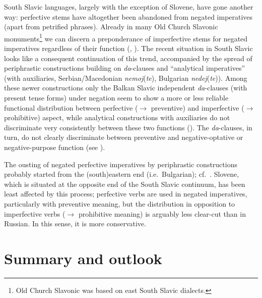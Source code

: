 \documentclass[output=paper,colorlinks,citecolor=brown]{langscibook}
\begin{document}
South Slavic languages, largely with the exception of Slovene, have gone another way: perfective stems have altogether been abandoned from negated imperatives (apart from petrified phrases). Already in many Old Church Slavonic monuments\footnote{Old Church Slavonic was based on east South Slavic dialects.} we can discern a preponderance of imperfective stems for negated imperatives regardless of their function (\citealt[71]{Kurzova-Ribarova1972}, \citealt[70--73]{Večerka1996}). The recent situation in South Slavic looks like a consequent continuation of this trend, accompanied by the spread of periphrastic constructions building on \textit{da}-clauses and ``analytical imperatives'' (with auxiliaries, Serbian/Macedonian \textit{nemoj}(\textit{te}), Bulgarian \textit{nedej}(\textit{te})). Among these newer constructions only the Balkan Slavic independent \textit{da}-clauses (with present tense forms) under negation seem to show a more or less reliable functional distribution between perfective (${\rightarrow}$ preventive) and imperfective (${\rightarrow}$ prohibitive) aspect, while analytical constructions with auxiliaries do not discriminate very consistently between these two functions (). The \textit{da}-clauses, in turn, do not clearly discriminate between preventive and negative-optative or negative-purpose function (see ).

The ousting of negated perfective imperatives by periphrastic constructions probably started from the (south)eastern end (i.e.\ Bulgarian); cf.\ \citet{Ivić1958}. Slovene, which is situated at the opposite end of the South Slavic continuum, has been least affected by this process; perfective verbs are used in negated imperatives, particularly with preventive meaning, but the distribution in opposition to imperfective verbs (${\rightarrow}$ prohibitive meaning) is arguably less clear-cut than in Russian. In this sense, it is more conservative.



\section{Summary and outlook}
\label{sec:summary}
\end{document}
